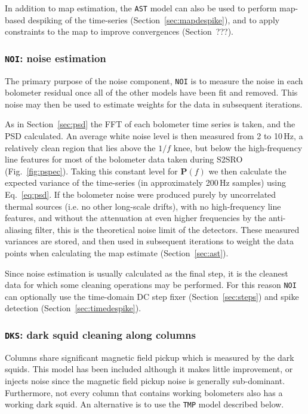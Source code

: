 \documentclass[useAMS,usenatbib,nofootinbib]{mn2e}
\begin{document}
In addition to map estimation, the \texttt{AST} model can also be used
to perform map-based despiking of the time-series
(Section~\ref{sec:mapdespike}), and to apply constraints to the map to
improve convergences (Section~???).

\subsubsection{\texttt{NOI}: noise estimation}
\label{sec:noi}

The primary purpose of the noise component, \texttt{NOI} is to measure
the noise in each bolometer residual once all of the other models have
been fit and removed. This noise may then be used to estimate weights
for the data in subsequent iterations.

As in Section~\ref{sec:psd} the FFT of each bolometer time series is
taken, and the PSD calculated. An average white noise level is then
measured from 2 to 10\,Hz, a relatively clean region that lies above
the $1/f$ knee, but below the high-frequency line features for most of
the bolometer data taken during S2SRO (Fig.~\ref{fig:pspec}). Taking
this constant level for $\mathbf{P}(f)$ we then calculate the expected
variance of the time-series (in approximately 200\,Hz samples) using
Eq.~\ref{eq:psd}. If the bolometer noise were produced purely by
uncorrelated thermal sources (i.e. no other long-scale drifts), with
no high-frequency line features, and without the attenuation at even
higher frequencies by the anti-aliasing filter, this is the
theoretical noise limit of the detectors. These measured variances are
stored, and then used in subsequent iterations to weight the data
points when calculating the map estimate (Section~\ref{sec:ast}).

Since noise estimation is usually calculated as the final step, it is
the cleanest data for which some cleaning operations may be
performed. For this reason \texttt{NOI} can optionally use the
time-domain DC step fixer (Section~\ref{sec:steps}) and spike
detection (Section~\ref{sec:timedespike}).

\subsubsection{\texttt{DKS}: dark squid cleaning along columns}
\label{sec:dks}

Columns share significant magnetic field pickup which is measured by
the dark squids. This model has been included although it makes little
improvement, or injects noise since the magnetic field pickup noise is
generally sub-dominant. Furthermore, not every column that contains
working bolometers also has a working dark squid. An alternative is to
use the \texttt{TMP} model described below.
\end{document}
